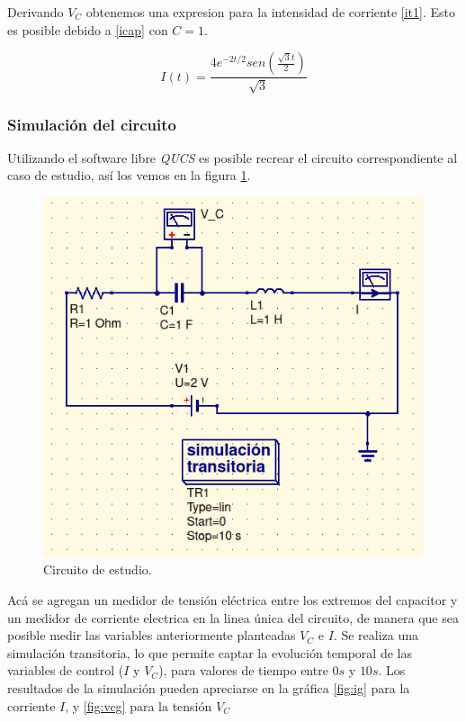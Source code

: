 \documentclass[letterpaper,12pt]{article} %
\begin{document}
Derivando $V_C$ obtenemos una expresion para la intensidad de corriente \eqref{it1}. Esto es posible debido a \eqref{icap} con $C=1$.

\begin{equation}
I(t)=\frac{4e^{-2t/2}sen\left( \frac{\sqrt{3}t}{2}\right)}{\sqrt{3}}
\label{it1}
\end{equation}

\newpage
\subsubsection*{Simulación del circuito}

Utilizando el software libre \textit{QUCS} es posible recrear el circuito correspondiente al caso de estudio, así los vemos en la figura \ref{fig:circ}.

\begin{figure}[h]
\includegraphics[scale=0.5]{circ.png}
\centering
\caption{Circuito de estudio.}
\label{fig:circ}
\end{figure}
Acá se agregan un medidor de tensión eléctrica entre los extremos del capacitor y un medidor de corriente electrica en la linea única del circuito, de manera que sea posible medir las variables anteriormente planteadas $V_C$ e $I$. Se realiza una simulación transitoria, lo que permite captar la evolución temporal de las variables de control ($I$ y $V_C$), para valores de tiempo entre $0 s$ y $10 s$. Los resultados de la simulación pueden apreciarse en la gráfica \ref{fig:ig} para la corriente $I$, y \ref{fig:vcg} para la tensión $V_C$
\end{document}
